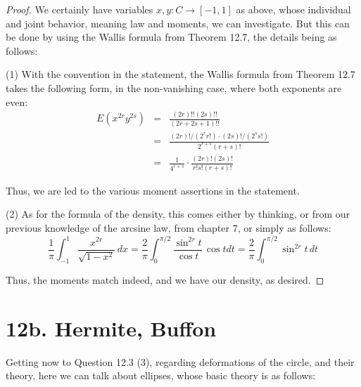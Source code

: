\documentclass[12pt]{amsbook}
\begin{document}
\begin{proof}
We certainly have variables $x,y:C\to[-1,1]$ as above, whose individual and joint behavior, meaning law and moments, we can investigate. But this can be done by using the Wallis formula from Theorem 12.7, the details being as follows:

\medskip

(1) With the convention in the statement, the Wallis formula from Theorem 12.7 takes the following form, in the non-vanishing case, where both exponents are even:
\begin{eqnarray*}
E(x^{2r}y^{2s})
&=&\frac{(2r)!!(2s)!!}{(2r+2s+1)!!}\\
&=&\frac{(2r)!/(2^rr!)\cdot (2s)!/(2^ss!)}{2^{r+s}(r+s)!}\\
&=&\frac{1}{4^{r+s}}\cdot\frac{(2r)!(2s)!}{r!s!(r+s)!}
\end{eqnarray*}

Thus, we are led to the various moment assertions in the statement. 

\medskip

(2) As for the formula of the density, this comes either by thinking, or from our previous knowledge of the arcsine law, from chapter 7, or simply as follows:
$$\frac{1}{\pi}\int_{-1}^1\frac{x^{2r}}{\sqrt{1-x^2}}\,dx=\frac{2}{\pi}\int_0^{\pi/2}\frac{\sin^{2r}t}{\cos t}\,\cos tdt=\frac{2}{\pi}\int_0^{\pi/2}\sin^{2r}t\,dt$$

Thus, the moments match indeed, and we have our density, as desired.
\end{proof}

\section*{12b. Hermite, Buffon}

Getting now to Question 12.3 (3), regarding deformations of the circle, and their theory, here we can talk about ellipses, whose basic theory is as follows:

\end{document}
